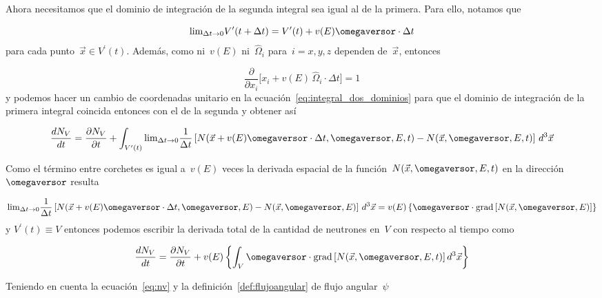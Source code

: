 Ahora necesitamos que el dominio de integración de la segunda integral sea igual al de la primera. Para ello, notamos que

\begin{equation*}
 \text{lim}_{\Delta t \rightarrow 0} V^{\prime}(t+\Delta t) = V^{\prime}(t) + v(E) \omegaversor \cdot \Delta t
\end{equation*}
%
para cada punto~$\vec{x} \in V^{\prime}(t)$. Además, como ni~$v(E)$ ni~$\hat{\Omega}_i$ para~$i=x,y,z$ dependen de~$\vec{x}$, entonces

\begin{equation*}
 \frac{\partial}{\partial x_i} \Big[ x_i + v(E) \, \hat{\Omega}_i \cdot \Delta t \Big] = 1
\end{equation*}
%
y podemos hacer un cambio de coordenadas unitario en la ecuación~\eqref{eq:integral_dos_dominios} para que el dominio de integración de la primera integral coincida entonces con el de la segunda y obtener así

\begin{equation*}
 \frac{dN_V}{dt} =  \frac{\partial N_V}{\partial t} +
\int_{V^{\prime}(t)} \text{lim}_{\Delta t \rightarrow 0} \frac{1}{\Delta t} \left[ N(\vec{x} + v(E)\omegaversor \cdot \Delta t, \omegaversor, E, t) - N(\vec{x}, \omegaversor, E, t) \right]  \, d^3\vec{x} 
\end{equation*}

Como el término entre corchetes es igual a~$v(E)$ veces la derivada espacial de la función~$N(\vec{x}, \omegaversor, E, t)$ en la dirección~$\omegaversor$ resulta

\begin{equation*}
 \text{lim}_{\Delta t \rightarrow 0} \frac{1}{\Delta t} \left[ N(\vec{x} + v(E)\omegaversor \cdot \Delta t, \omegaversor, E) - N(\vec{x}, \omegaversor, E)\right] \, d^3\vec{x}  = v(E) \left\{ \omegaversor \cdot \text{grad} \left[N(\vec{x}, \omegaversor, E)\right] \right\}
\end{equation*}
%
y $V^{\prime}(t) \equiv V$ entonces podemos escribir la derivada total de la cantidad de neutrones en~$V$ con respecto al tiempo como

\begin{equation*}
 \frac{dN_V}{dt} = \frac{\partial N_V}{\partial t} + v(E) \left\{ \int_{V} \omegaversor \cdot \text{grad} \left[ N(\vec{x}, \omegaversor, E, t) \right]  d^3\vec{x} \right\}
\end{equation*}

Teniendo en cuenta la ecuación~\eqref{eq:nv} y la definición~\ref{def:flujoangular} de flujo angular~$\psi$

